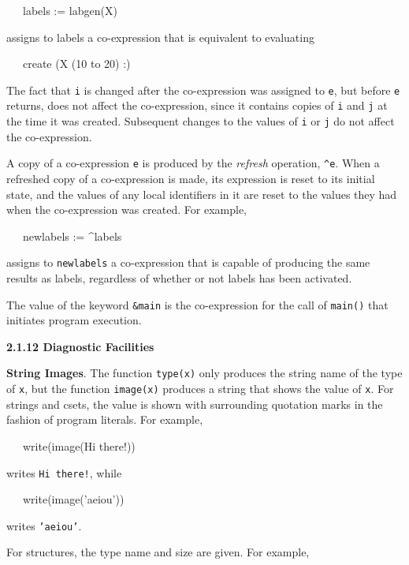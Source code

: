 {\ttfamily\mdseries
\ \ \ labels := labgen({\textquotedbl}X{\textquotedbl})}

\noindent assigns to labels a co-expression that is equivalent to evaluating

{\ttfamily\mdseries
\ \ \ create ({\textquotedbl}X{\textquotedbl} {\textbar}{\textbar} (10 to 20) {\textbar}{\textbar}
{\textquotedbl}:{\textquotedbl})}

The fact that \texttt{i} is changed after the co-expression was
assigned to \texttt{e}, but before \texttt{e} returns, does not affect
the co-expression, since it contains copies of \texttt{i} and
\texttt{j} at the time it was created.  Subsequent changes to the
values of \texttt{i} or \texttt{j} do not affect the co-expression.

A copy of a co-expression \texttt{e} is produced by the
\textit{refresh }operation, \texttt{\^{}e}. When a refreshed copy of a
co-expression is made, its expression is reset to its initial state,
and the values of any local identifiers in it are reset to the values
they had when the co-expression was created. For example,

{\ttfamily\mdseries
\ \ \ newlabels := \^{}labels}

\noindent assigns to \texttt{newlabels} a co-expression that is
capable of producing the same results as labels, regardless of whether
or not labels has been activated.

The value of the keyword \texttt{\&main} is the co-expression for the
call of \texttt{main()} that initiates program execution.


{\sffamily\bfseries
2.1.12 Diagnostic Facilities}

\textbf{String Images}. The function \texttt{type(x)} only produces
the string name of the type of \texttt{x}, but the function
\texttt{image(x)} produces a string that shows the value of
\texttt{x}. For strings and csets, the value is shown with surrounding
quotation marks in the fashion of program literals. For example,

{\ttfamily\mdseries
\ \ \ write(image({\textquotedbl}Hi there!{\textquotedbl}))}

\noindent writes \texttt{{\textquotedbl}Hi there!{\textquotedbl}}, while

{\ttfamily\mdseries
\ \ \ write(image('aeiou'))}

\noindent writes \texttt{{}'aeiou'}.

For structures, the type name and size are given. For example,

